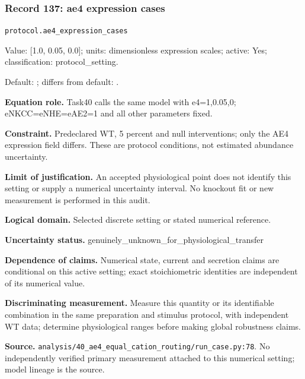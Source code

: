 \subsubsection*{Record 137: ae4 expression cases}
{\small \nolinkurl{protocol.ae4_expression_cases}\par

Value: [1.0, 0.05, 0.0]; units: dimensionless expression scales; active: Yes; classification: protocol\_setting.\par

Default: ; differs from default: .\par

\textbf{Equation role.} Task40 calls the same model with e4=1,0.05,0; eNKCC=eNHE=eAE2=1 and all other parameters fixed.\par

\textbf{Constraint.} Predeclared WT, 5 percent and null interventions; only the AE4 expression field differs. These are protocol conditions, not estimated abundance uncertainty.\par

\textbf{Limit of justification.} An accepted physiological point does not identify this setting or supply a numerical uncertainty interval. No knockout fit or new measurement is performed in this audit.\par

\textbf{Logical domain.} Selected discrete setting or stated numerical reference.\par

\textbf{Uncertainty status.} genuinely\_unknown\_for\_physiological\_transfer\par

\textbf{Dependence of claims.} Numerical state, current and secretion claims are conditional on this active setting; exact stoichiometric identities are independent of its numerical value.\par

\textbf{Discriminating measurement.} Measure this quantity or its identifiable combination in the same preparation and stimulus protocol, with independent WT data; determine physiological ranges before making global robustness claims.\par

\textbf{Source.} \nolinkurl{analysis/40_ae4_equal_cation_routing/run_case.py:78}. No independently verified primary measurement attached to this numerical setting; model lineage is the source.\par}
